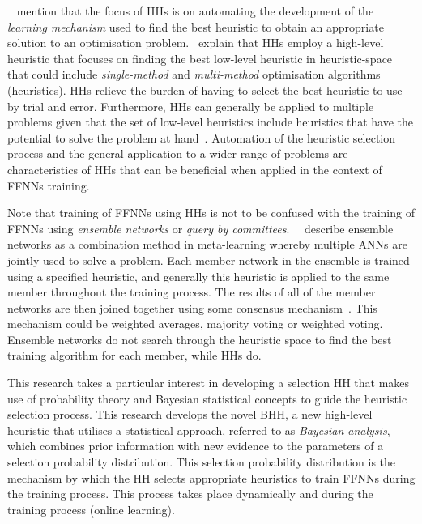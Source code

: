 \citeauthor{ref:grobler:2012}~\cite{ref:grobler:2012} mention that the focus of \acp{HH} is on automating the development of the \textit{learning mechanism} used to find the best heuristic to obtain an appropriate solution to an optimisation problem.~\citeauthor{ref:grobler:2012} explain that \acp{HH} employ a high-level heuristic that focuses on finding the best low-level heuristic in heuristic-space that could include \textit{single-method} and \textit{multi-method} optimisation algorithms (heuristics). \acp{HH} relieve the burden of having to select the best heuristic to use by trial and error. Furthermore, \acp{HH} can generally be applied to multiple problems given that the set of low-level heuristics include heuristics that have the potential to solve the problem at hand~\cite{ref:burke:2010}. Automation of the heuristic selection process and the general application to a wider range of problems are characteristics of \acp{HH} that can be beneficial when applied in the context of \acp{FFNN} training.

Note that training of \acp{FFNN} using \acp{HH} is not to be confused with the training of \acp{FFNN} using \textit{ensemble networks} or \textit{query by committees}.~\citeauthor{ref:pappa:2014}~\cite{ref:pappa:2014} describe ensemble networks as a combination method in meta-learning whereby multiple \acp{ANN} are jointly used to solve a problem. Each member network in the ensemble is trained using a specified heuristic, and generally this heuristic is applied to the same member throughout the training process. The results of all of the member networks are then joined together using some consensus mechanism~\cite{ref:zhou:2002}. This mechanism could be weighted averages, majority voting or weighted voting. Ensemble networks do not search through the heuristic space to find the best training algorithm for each member, while \acp{HH} do.

This research takes a particular interest in developing a selection \acs{HH} that makes use of probability theory and Bayesian statistical concepts to guide the heuristic selection process. This research develops the novel \Acf{BHH}, a new high-level heuristic that utilises a statistical approach, referred to as \textit{Bayesian analysis}, which combines prior information with new evidence to the parameters of a selection probability distribution. This selection probability distribution is the mechanism by which the \acs{HH} selects appropriate heuristics to train \acp{FFNN} during the training process. This process takes place dynamically and during the training process (online learning).


